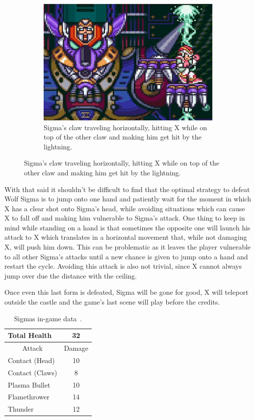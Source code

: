\begin{figure}[htp]
	\centering
	\begin{subfigure}{0.5\linewidth}
		\centering
		\includegraphics[width=\linewidth]{figures/X1/Sigma_stages/WolfSigma_claw_2.jpg}
		\caption{Sigma's claw traveling horizontally, hitting X while on top of the other claw and making him get hit by the lightning.}
	\end{subfigure}
\end{figure}

With that said it shouldn't be difficult to find that the optimal strategy to defeat Wolf Sigma is to jump onto one hand and patiently wait for the moment in which X has a clear shot onto Sigma's head, while avoiding situations which can cause X to fall off and making him vulnerable to Sigma's attack. One thing to keep in mind while standing on a hand is that sometimes the opposite one will launch his attack to X which translates in a horizontal movement that, while not damaging X, will push him down. This can be problematic as it leaves the player vulnerable to all other Sigma's attacks until a new chance is given to jump onto a hand and restart the cycle. Avoiding this attack is also not trivial, since X cannot always jump over due the distance with the ceiling.

Once even this last form is defeated, Sigma will be gone for good, X will teleport outside the castle and the game's last scene will play before the credits.
\begin{table}
	\centering
	\begin{tabular}[h]{l c}
		\toprule
		Total Health  & 32\\
		\midrule
		\multicolumn{1}{c}{Attack} & \multicolumn{1}{c}{Damage}\\
		Contact (Head) & 10\\
		Contact (Claws) & 8\\
		Plasma Bullet & 10\\
		Flamethrower & 14\\
		Thunder & 12\\
		\bottomrule
	\end{tabular}
	\caption{Sigmas in-game data~\cite{wiki:Sigma}.}
\end{table}

